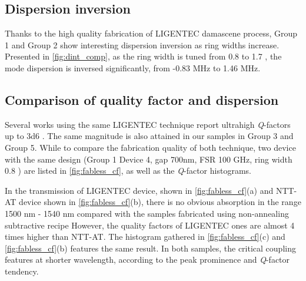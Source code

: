 \subsection{Dispersion inversion}

Thanks to the high quality fabrication of LIGENTEC damascene process, Group 1 and Group 2 show interesting dispersion inversion as ring widths increase. Presented in \autoref{fig:dint_comp}, as the ring width is tuned from 0.8 \um to 1.7 \um, the mode dispersion is inversed significantly, from -0.83 MHz to 1.46 MHz.

\begin{figure}
	\centering
	
	\label{fig:dint_comp}
\end{figure}


\subsection{Comparison of quality factor and dispersion}


Several works using the same LIGENTEC technique report ultrahigh \textit{Q}-factors up to \num{3d6} \cites{Yu2019, Vaidya2019}. The same magnitude is also attained in our samples in Group 3 and Group 5. While to compare the fabrication quality of both technique, two device with the same design (Group 1 Device 4, gap 700nm, FSR 100 GHz, ring width 0.8 \um ) are listed in \autoref{fig:fabless_cf}, as well as the \textit{Q}-factor histograms.

\begin{figure}
	\centering
	
	\label{fig:fabless_cf}
\end{figure}

In the transmission of LIGENTEC device, shown in \autoref{fig:fabless_cf}(a)  and NTT-AT device shown in \autoref{fig:fabless_cf}(b), there is no obvious absorption in the range 1500 nm - 1540 nm compared with the samples fabricated using non-annealing subtractive recipe
However, the quality factors of LIGENTEC ones are almost 4 times higher than NTT-AT.
The histogram gathered in \autoref{fig:fabless_cf}(c) and \autoref{fig:fabless_cf}(b) features the same result.
In both samples, the critical coupling features at shorter wavelength, according to the peak prominence and \textit{Q}-factor tendency. 

